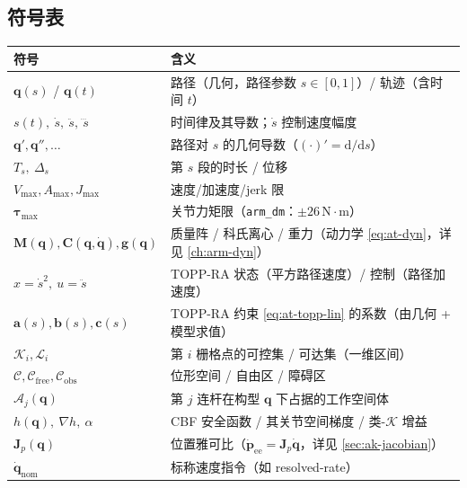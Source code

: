 \subsection*{符号表}
\begin{longtable}{p{} p{}}
\toprule
符号 & 含义 \\
\midrule
\endhead
$\mathbf{q}(s)$ / $\mathbf{q}(t)$ & 路径（几何，路径参数 $s\in[0,1]$）/ 轨迹（含时间 $t$） \\
$s(t),\ \dot s,\ \ddot s,\ \dddot s$ & 时间律及其导数；$\dot s$ 控制速度幅度 \\
$\mathbf{q}',\mathbf{q}'',\dots$ & 路径对 $s$ 的几何导数（$(\cdot)'=\mathrm{d}/\mathrm{d}s$） \\
$T_s,\ \Delta_s$ & 第 $s$ 段的时长 / 位移 \\
$V_{\max},A_{\max},J_{\max}$ & 速度/加速度/jerk 限 \\
$\boldsymbol{\tau}_{\max}$ & 关节力矩限（\texttt{arm\_dm}：$\pm 26\,\mathrm{N\!\cdot\! m}$） \\
$\mathbf{M}(\mathbf{q}),\mathbf{C}(\mathbf{q},\dot{\mathbf{q}}),\mathbf{g}(\mathbf{q})$ & 质量阵 / 科氏离心 / 重力（动力学 \cref{eq:at-dyn}，详见 \cref{ch:arm-dyn}） \\
$x=\dot s^2,\ u=\ddot s$ & TOPP-RA 状态（平方路径速度）/ 控制（路径加速度） \\
$\mathbf{a}(s),\mathbf{b}(s),\mathbf{c}(s)$ & TOPP-RA 约束 \cref{eq:at-topp-lin} 的系数（由几何 + 模型求值） \\
$\mathcal{K}_i,\mathcal{L}_i$ & 第 $i$ 栅格点的可控集 / 可达集（一维区间） \\
$\mathcal{C},\mathcal{C}_{\mathrm{free}},\mathcal{C}_{\mathrm{obs}}$ & 位形空间 / 自由区 / 障碍区 \\
$\mathcal{A}_j(\mathbf{q})$ & 第 $j$ 连杆在构型 $\mathbf{q}$ 下占据的工作空间体 \\
$h(\mathbf{q}),\ \nabla h,\ \alpha$ & CBF 安全函数 / 其关节空间梯度 / 类-$\mathcal{K}$ 增益 \\
$\mathbf{J}_p(\mathbf{q})$ & 位置雅可比（$\dot{\mathbf{p}}_{\mathrm{ee}}=\mathbf{J}_p\dot{\mathbf{q}}$，详见 \cref{sec:ak-jacobian}） \\
$\dot{\mathbf{q}}_{\mathrm{nom}}$ & 标称速度指令（如 resolved-rate） \\
\bottomrule
\end{longtable}

